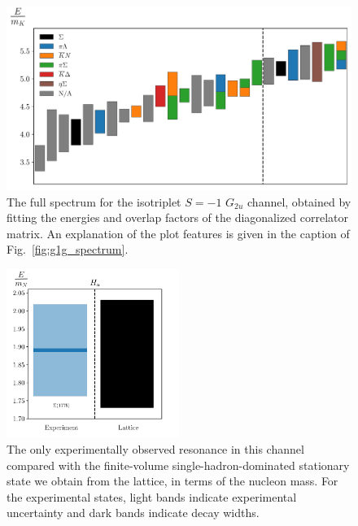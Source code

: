 \begin{figure}[H]
    \centering
    \hspace*{-0.5in}\includegraphics[width=\textwidth]{figures/sigmas/g2u/staircase_mk.pdf}
    \caption{The full spectrum for the isotriplet $S=-1$ $G_{2u}$ channel, obtained by fitting the energies and overlap factors of the diagonalized correlator matrix. An explanation of the plot features is given in the caption of Fig.~\ref{fig:g1g_spectrum}.}\label{fig:g2u_spectrum}
\end{figure}

\begin{figure}[H]
    \centering
    \includegraphics[width=0.5\textwidth]{figures/sigmas/g2u/expvslat.pdf}
    \caption{The only experimentally observed resonance in this channel compared with the finite-volume single-hadron-dominated stationary state we obtain from the lattice, in terms of the nucleon mass. For the experimental states, light bands indicate experimental uncertainty and dark bands indicate decay widths.}\label{fig:g2u_exp}
\end{figure}

